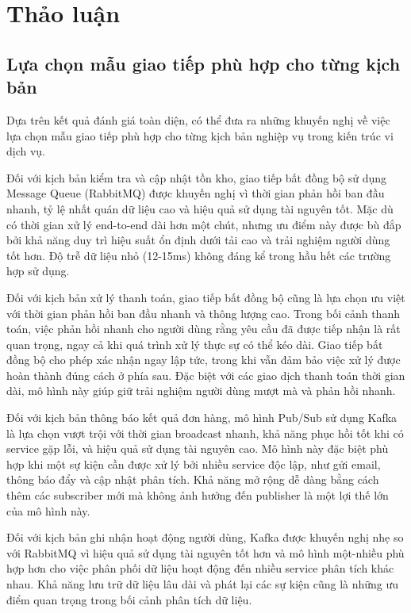 \section{Thảo luận}

\subsection{Lựa chọn mẫu giao tiếp phù hợp cho từng kịch bản}
Dựa trên kết quả đánh giá toàn diện, có thể đưa ra những khuyến nghị về việc lựa chọn mẫu giao tiếp phù hợp cho từng kịch bản nghiệp vụ trong kiến trúc vi dịch vụ.

Đối với kịch bản kiểm tra và cập nhật tồn kho, giao tiếp bất đồng bộ sử dụng Message Queue (RabbitMQ) được khuyến nghị vì thời gian phản hồi ban đầu nhanh, tỷ lệ nhất quán dữ liệu cao và hiệu quả sử dụng tài nguyên tốt. Mặc dù có thời gian xử lý end-to-end dài hơn một chút, nhưng ưu điểm này được bù đắp bởi khả năng duy trì hiệu suất ổn định dưới tải cao và trải nghiệm người dùng tốt hơn. Độ trễ dữ liệu nhỏ (12-15ms) không đáng kể trong hầu hết các trường hợp sử dụng.

Đối với kịch bản xử lý thanh toán, giao tiếp bất đồng bộ cũng là lựa chọn ưu việt với thời gian phản hồi ban đầu nhanh và thông lượng cao. Trong bối cảnh thanh toán, việc phản hồi nhanh cho người dùng rằng yêu cầu đã được tiếp nhận là rất quan trọng, ngay cả khi quá trình xử lý thực sự có thể kéo dài. Giao tiếp bất đồng bộ cho phép xác nhận ngay lập tức, trong khi vẫn đảm bảo việc xử lý được hoàn thành đúng cách ở phía sau. Đặc biệt với các giao dịch thanh toán thời gian dài, mô hình này giúp giữ trải nghiệm người dùng mượt mà và phản hồi nhanh.

Đối với kịch bản thông báo kết quả đơn hàng, mô hình Pub/Sub sử dụng Kafka là lựa chọn vượt trội với thời gian broadcast nhanh, khả năng phục hồi tốt khi có service gặp lỗi, và hiệu quả sử dụng tài nguyên cao. Mô hình này đặc biệt phù hợp khi một sự kiện cần được xử lý bởi nhiều service độc lập, như gửi email, thông báo đẩy và cập nhật phân tích. Khả năng mở rộng dễ dàng bằng cách thêm các subscriber mới mà không ảnh hưởng đến publisher là một lợi thế lớn của mô hình này.

Đối với kịch bản ghi nhận hoạt động người dùng, Kafka được khuyến nghị nhẹ so với RabbitMQ vì hiệu quả sử dụng tài nguyên tốt hơn và mô hình một-nhiều phù hợp hơn cho việc phân phối dữ liệu hoạt động đến nhiều service phân tích khác nhau. Khả năng lưu trữ dữ liệu lâu dài và phát lại các sự kiện cũng là những ưu điểm quan trọng trong bối cảnh phân tích dữ liệu.

